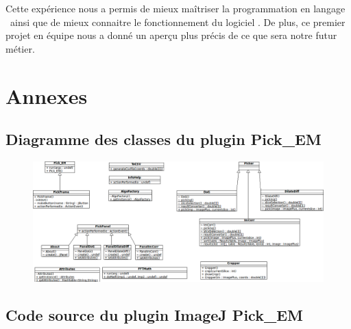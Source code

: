 \documentclass[12pt,a4paper]{report}
\begin{document}
Cette expérience nous a permis de mieux ma\^itriser la programmation en langage \java ~ainsi que de mieux connaitre le fonctionnement du logiciel \imj. De plus, ce premier projet en équipe nous a donné un aperçu plus précis de ce que sera notre futur métier. 





\appendix
\chapter{Annexes}


\newpage

\section{Diagramme des classes du plugin Pick\_EM}

\begin{figure}[!ht] 
\begin{center}
\includegraphics[width=1.4\textwidth, angle=90]{diagComplet.png}
\end{center}
\end{figure}

\section{Code source du plugin ImageJ Pick\_EM}
\end{document}
